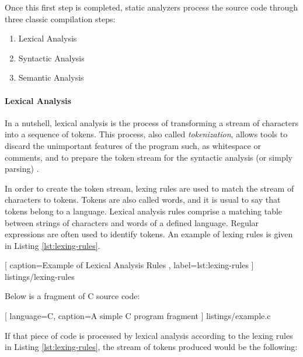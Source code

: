 \clearpage

Once this first step is completed, static analyzers process the source code through three classic compilation steps:

\begin{enumerate}
    \item Lexical Analysis
    \item Syntactic Analysis
    \item Semantic Analysis
\end{enumerate}

\paragraph{Lexical Analysis}

In a nutshell, lexical analysis is the process of transforming a stream of characters into a sequence of tokens. This process, also called \emph{tokenization}, allows tools to discard the unimportant features of the program such, as whitespace or comments, and to prepare the token stream for the syntactic analysis (or simply parsing) \cite{chess2007secure,wikibooks2016compiler}.

In order to create the token stream, lexing rules are used to match the stream of characters to tokens. Tokens are also called words, and it is usual to say that tokens belong to a language. Lexical analysis rules comprise a matching table between strings of characters and words of a defined language. Regular expressions are often used to identify tokens. An example of lexing rules is given in Listing \ref{lst:lexing-rules}.

\vspace{0.5cm}


    [
        caption=Example of Lexical Analysis Rules \cite{chess2007secure},
        label=lst:lexing-rules
    ]
    {listings/lexing-rules}

Below is a fragment of C source code:

\vspace{0.5cm}


    [
        language=C,
        caption=A simple C program fragment \cite{chess2007secure}
    ]
    {listings/example.c}
    
If that piece of code is processed by lexical analysis according to the lexing rules in Listing \ref{lst:lexing-rules}, the stream of tokens produced would be the following:

\vspace{0.5cm}

